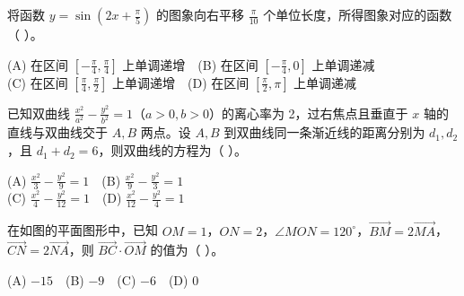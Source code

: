 \begin{question}
将函数 $y=\sin\left(2x+\frac\pi5\right)$ 的图象向右平移 $\frac\pi{10}$ 个单位长度，所得图象对应的函数（ ）。

(A) 在区间 $\left[-\frac\pi4,\frac\pi4\right]$ 上单调递增　(B) 在区间 $\left[-\frac\pi4,0\right]$ 上单调递减\\
(C) 在区间 $\left[\frac\pi4,\frac\pi2\right]$ 上单调递增　(D) 在区间 $\left[\frac\pi2,\pi\right]$ 上单调递减

\end{question}
\begin{question}
已知双曲线 $\frac{x^2}{a^2}-\frac{y^2}{b^2}=1$（$a>0,b>0$）的离心率为 2，过右焦点且垂直于 $x$ 轴的直线与双曲线交于 $A,B$ 两点。设 $A,B$ 到双曲线同一条渐近线的距离分别为 $d_1,d_2$，且 $d_1+d_2=6$，则双曲线的方程为（ ）。

(A) $\frac{x^2}{3}-\frac{y^2}{9}=1$　(B) $\frac{x^2}{9}-\frac{y^2}{3}=1$\\
(C) $\frac{x^2}{4}-\frac{y^2}{12}=1$　(D) $\frac{x^2}{12}-\frac{y^2}{4}=1$

\Needspace{0.4\textheight}
\end{question}
\begin{question}
在如图的平面图形中，已知 $OM=1$，$ON=2$，$\angle MON=120^\circ$，$\overrightarrow{BM}=2\overrightarrow{MA}$，$\overrightarrow{CN}=2\overrightarrow{NA}$，则 $\overrightarrow{BC}\cdot\overrightarrow{OM}$ 的值为（ ）。
\nopagebreak[4]
\begin{center}\end{center}
\nopagebreak[4]
(A) $-15$　(B) $-9$　(C) $-6$　(D) 0

\end{question}

